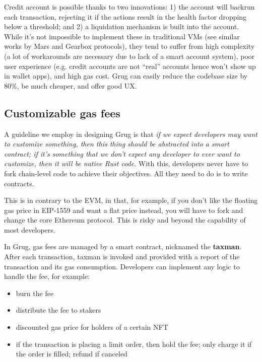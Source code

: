 \documentclass{article}
\begin{document}
Credit account is possible thanks to two innovations: 1) the account will backrun each transaction, rejecting it if the actions result in the health factor dropping below a threshold; and 2) a liquidation mechanism is built into the account. While it's not impossible to implement these in traditional VMs (see similar works by Mars\supercite{marsprotocol} and Gearbox\supercite{gearboxprotocol} protocols), they tend to suffer from high complexity (a lot of workarounds are necessary due to lack of a smart account system), poor user experience (e.g. credit accounts are not ``real'' accounts hence won't show up in wallet apps), and high gas cost. Grug can easily reduce the codebase size by 80\%, be much cheaper, and offer good UX.

\subsection{Customizable gas fees}

A guideline we employ in designing Grug is that \textit{if we expect developers may want to customize something, then this thing should be abstracted into a smart contract; if it's something that we don't expect any developer to ever want to customize, then it will be native Rust code}. With this, developers never have to fork chain-level code to achieve their objectives. All they need to do is to write contracts.

This is in contrary to the EVM, in that, for example, if you don't like the floating gas price in EIP-1559 and want a flat price instead, you will have to fork and change the core Ethereum protocol. This is risky and beyond the capability of most developers.

In Grug, gas fees are managed by a smart contract, nicknamed the \textbf{taxman}. After each transaction, taxman is invoked and provided with a report of the transaction and its gas consumption. Developers can implement any logic to handle the fee, for example:

\begin{itemize}
  \item burn the fee
  \item distribute the fee to stakers
  \item discounted gas price for holders of a certain NFT
  \item if the transaction is placing a limit order, then hold the fee; only charge it if the order is filled; refund if canceled
\end{itemize}
\end{document}
